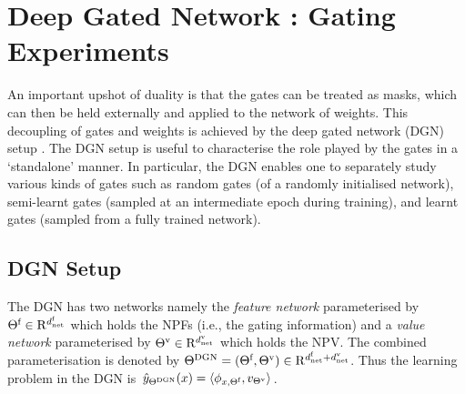 \section{Deep Gated Network : Gating Experiments}
An important upshot of duality is that the gates can be treated as masks, which can then be held externally and applied to the network of weights. This decoupling of gates and weights is achieved by the deep gated network (DGN) setup \cite{npk}.
The DGN setup is useful to characterise the role played by the gates in a `standalone' manner. In particular, the DGN enables one to separately study various kinds of gates such as random gates (of a randomly initialised network), semi-learnt gates (sampled at an intermediate epoch during training), and learnt gates (sampled from a fully trained network).  
\subsection{DGN Setup}
\FloatBarrier
\begin{figure}[h]
\end{figure}
 The DGN has two networks namely the \emph{feature network} parameterised by $\Theta^{\textrm{f}}\in\mathrm{R}^{d^{\text{f}}_{\text{net}}}$ which holds the NPFs (i.e., the gating information) and a \emph{value network} parameterised by ${\Theta}^{\text{v}}\in\mathrm{R}^{d^{\text{v}}_{\text{net}}}$ which holds the NPV.  The combined parameterisation is denoted by $\Theta^{\text{DGN}}=(\Theta^{\textrm{f}},{\Theta}^{\text{v}})\in \mathrm{R}^{d^{\text{f}}_{\text{net}}+d^{\text{v}}_{\text{net}}}$.  Thus the learning problem in the DGN is $\hat{y}_{\Theta^{\text{DGN}}}(x)=\langle \phi_{x,\Theta^{\textrm{f}}},v_{{\Theta}^{\text{v}}}\rangle$. 
